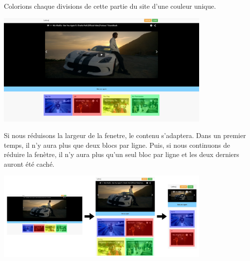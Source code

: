 \documentclass{article}
\begin{document}
Colorions chaque divisions de cette partie du site d'une couleur unique.
\begin{center}
\vspace{0.5cm}
\includegraphics[width=0.8\textwidth]{pc4}
\vspace{0.5cm}
\end{center}
Si nous r\'eduisons la largeur de la fenetre, le contenu s'adaptera. Dans un premier temps, il n'y aura plus que deux blocs par ligne. Puis, si nous continuons de r\'eduire la fen\`etre, il n'y aura plus qu'un seul bloc par ligne et les deux derniers auront \'et\'e cach\'e.
\begin{center}
\vspace{0.5cm}
\includegraphics[width=0.8\textwidth]{pc7}
\vspace{0.5cm}\\
\end{center}
\end{document}
